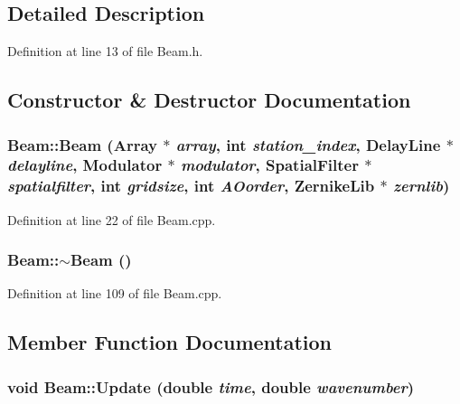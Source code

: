 \subsection{Detailed Description}


Definition at line 13 of file Beam.h.



\subsection{Constructor \& Destructor Documentation}
\hypertarget{classBeam_a29260e5e50b1d45b32747442ccdd56f7}{
\subsubsection[{Beam}]{\setlength{\rightskip}{0pt plus 5cm}Beam::Beam ({\bf Array} $\ast$ {\em array}, \/  int {\em station\_\-index}, \/  {\bf DelayLine} $\ast$ {\em delayline}, \/  {\bf Modulator} $\ast$ {\em modulator}, \/  {\bf SpatialFilter} $\ast$ {\em spatialfilter}, \/  int {\em gridsize}, \/  int {\em AOorder}, \/  {\bf ZernikeLib} $\ast$ {\em zernlib})}}
\label{classBeam_a29260e5e50b1d45b32747442ccdd56f7}


Definition at line 22 of file Beam.cpp.

\hypertarget{classBeam_ae00ca4866a8f1f721da45ce7c26c6d74}{
\subsubsection[{$\sim$Beam}]{\setlength{\rightskip}{0pt plus 5cm}Beam::$\sim$Beam ()}}
\label{classBeam_ae00ca4866a8f1f721da45ce7c26c6d74}


Definition at line 109 of file Beam.cpp.



\subsection{Member Function Documentation}
\hypertarget{classBeam_a4d94ec1dd570ba7b50614ae39bda51fc}{
\subsubsection[{Update}]{\setlength{\rightskip}{0pt plus 5cm}void Beam::Update (double {\em time}, \/  double {\em wavenumber})}}
\label{classBeam_a4d94ec1dd570ba7b50614ae39bda51fc}



